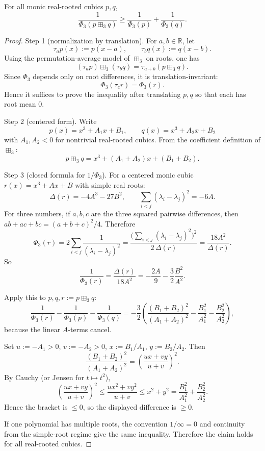 \begin{proposition}[Full inequality for $n=3$]\label{prop:q4-n3}
For all monic real-rooted cubics $p,q$,
\[
\frac{1}{\Phi_3(p\boxplus_3 q)}\ge \frac{1}{\Phi_3(p)}+\frac{1}{\Phi_3(q)}.
\]
\end{proposition}

\begin{proof}
Step 1 (normalization by translation).
For $a,b\in\mathbb R$, let
\[
\tau_a p(x):=p(x-a),\qquad \tau_b q(x):=q(x-b).
\]
Using the permutation-average model of $\boxplus_3$ on roots, one has
\[
(\tau_a p)\boxplus_3(\tau_b q)=\tau_{a+b}(p\boxplus_3 q).
\]
Since $\Phi_3$ depends only on root differences, it is translation-invariant:
\[
\Phi_3(\tau_c r)=\Phi_3(r).
\]
Hence it suffices to prove the inequality after translating $p,q$ so that each has root mean $0$.

Step 2 (centered form).
Write
\[
p(x)=x^3+A_1x+B_1,\qquad q(x)=x^3+A_2x+B_2
\]
with $A_1,A_2<0$ for nontrivial real-rooted cubics.
From the coefficient definition of $\boxplus_3$:
\[
p\boxplus_3 q=x^3+(A_1+A_2)x+(B_1+B_2).
\]

Step 3 (closed formula for $1/\Phi_3$).
For a centered monic cubic $r(x)=x^3+Ax+B$ with simple real roots:
\[
\Delta(r)=-4A^3-27B^2,\qquad
\sum_{i<j}(\lambda_i-\lambda_j)^2=-6A.
\]
For three numbers, if $a,b,c$ are the three squared pairwise differences, then
$ab+ac+bc=(a+b+c)^2/4$. Therefore
\[
\Phi_3(r)=2\sum_{i<j}\frac{1}{(\lambda_i-\lambda_j)^2}
      =\frac{\bigl(\sum_{i<j}(\lambda_i-\lambda_j)^2\bigr)^2}{2\,\Delta(r)}
      =\frac{18A^2}{\Delta(r)}.
\]
So
\[
\frac{1}{\Phi_3(r)}=\frac{\Delta(r)}{18A^2}
=-\frac{2A}{9}-\frac{3}{2}\frac{B^2}{A^2}.
\]

Apply this to $p,q,r:=p\boxplus_3 q$:
\[
\frac{1}{\Phi_3(r)}-\frac{1}{\Phi_3(p)}-\frac{1}{\Phi_3(q)}
=-\frac{3}{2}\left(
\frac{(B_1+B_2)^2}{(A_1+A_2)^2}
-\frac{B_1^2}{A_1^2}
-\frac{B_2^2}{A_2^2}\right),
\]
because the linear $A$-terms cancel.

Set $u:=-A_1>0$, $v:=-A_2>0$, $x:=B_1/A_1$, $y:=B_2/A_2$. Then
\[
\frac{(B_1+B_2)^2}{(A_1+A_2)^2}=\left(\frac{ux+vy}{u+v}\right)^2.
\]
By Cauchy (or Jensen for $t\mapsto t^2$),
\[
\left(\frac{ux+vy}{u+v}\right)^2\le \frac{ux^2+vy^2}{u+v}\le x^2+y^2
=\frac{B_1^2}{A_1^2}+\frac{B_2^2}{A_2^2}.
\]
Hence the bracket is $\le 0$, so the displayed difference is $\ge 0$.

If one polynomial has multiple roots, the convention $1/\infty=0$ and continuity from the simple-root regime give the same inequality. Therefore the claim holds for all real-rooted cubics.
\end{proof}

